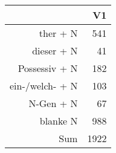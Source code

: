 \begin{tabular}{rr}
  \hline
 & V1 \\ 
  \hline
ther + N & 541 \\ 
  dieser + N &  41 \\ 
  Possessiv + N & 182 \\ 
  ein-/welch- + N & 103 \\ 
  N-Gen + N &  67 \\ 
  blanke N & 988 \\ 
  Sum & 1922 \\ 
   \hline
\end{tabular}
